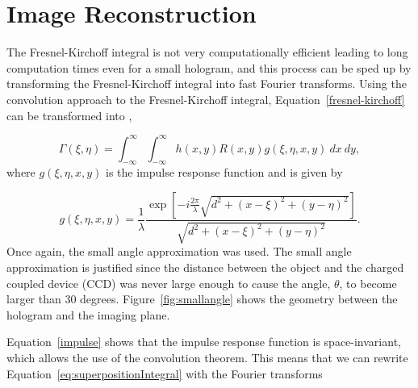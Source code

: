 

    \section{Image Reconstruction}

    The Fresnel-Kirchoff integral is not very computationally efficient
    leading to long computation times even for a small hologram, and this process can be
    sped up by transforming the Fresnel-Kirchoff integral into fast Fourier
    transforms.
    Using the convolution approach to the Fresnel-Kirchoff integral,
    Equation~\ref{fresnel-kirchoff} can be transformed into
    \cite{schnars_digital_2002},

    \begin{equation}
        \Gamma(\xi,\eta) = \int_{-\infty}^{\infty}\int_{-\infty}^{\infty}
        h(x,y)R(x,y) g(\xi,\eta,x,y)~dx~dy,
        \label{eq:superpositionIntegral}
    \end{equation}
    where $g(\xi,\eta,x,y)$ is the impulse response function and is given by

    \begin{equation}
        g(\xi,\eta,x,y)=\frac{1}{\lambda}\frac{\exp\left[
        -i\frac{2\pi}{\lambda}\sqrt{d^{2}+(x-\xi)^{2}+(y-\eta)^{2}}
    \right]}{\sqrt{d^{2}+(x-\xi)^{2}+(y-\eta)^{2}}}.
        \label{impulse}
    \end{equation}
    Once again, the small angle approximation was used. The small angle
    approximation is justified since the distance between the object and the
    charged coupled device (CCD) was never large enough to cause the angle,
    $\theta$, to become larger than 30 degrees. Figure~\ref{fig:smallangle}
    shows the geometry between the hologram and the imaging plane.

    Equation~\ref{impulse}
    shows that the impulse response function is space-invariant, which allows the
    use of the convolution theorem. This means that we can rewrite
    Equation~\ref{eq:superpositionIntegral} with the Fourier transforms

